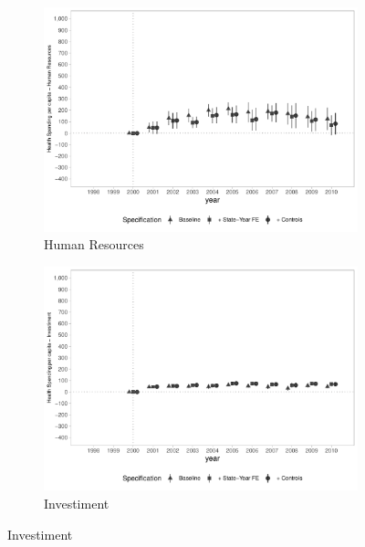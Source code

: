 \begin{figure}[h!]
    \begin{center}
    \caption{Effects on Public Health Spending per capita - By Type}\label{fig:10}
    \begin{subfigure}{0.48\textwidth}
        \centering
        \caption{\scriptsize Human Resources}\label{fig:10a}
        \includegraphics[width=\textwidth]{plots/spending/siops_desppessoal_pcapita_dist_ec29_baseline_dist_ec29_baseline_full.pdf}
    \end{subfigure}
    \begin{subfigure}{0.48\textwidth}
        \centering
        \caption{\scriptsize Investiment}\label{fig:10b}
        \includegraphics[width=\textwidth]{plots/spending/siops_despinvest_pcapita_dist_ec29_baseline_dist_ec29_baseline_full.pdf}

\end{subfigure}
\end{center}
\end{figure}
